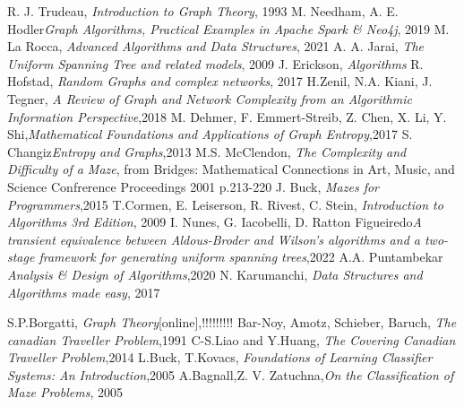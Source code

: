 
\begin{thebibliography}{100}

R. J. Trudeau, \emph{Introduction to Graph Theory}, 1993
M. Needham, A. E. Hodler\emph{Graph Algorithms, Practical Examples in Apache Spark & Neo4j}, 2019
M. La Rocca, \emph{Advanced Algorithms and Data Structures}, 2021 
A. A. Jarai, \emph{The Uniform Spanning Tree and related models}, 2009
 J. Erickson, \emph{Algorithms}
R. Hofstad, \emph{Random Graphs and complex networks}, 2017
H.Zenil, N.A. Kiani, J. Tegner, \emph{A Review of Graph and Network Complexity from an Algorithmic Information Perspective},2018
M. Dehmer, F. Emmert-Streib, Z. Chen, X. Li, Y. Shi,\emph{Mathematical Foundations and Applications of Graph Entropy},2017
S. Changiz\emph{Entropy and Graphs},2013
M.S. McClendon, \emph{The Complexity and Difficulty of a Maze}, from Bridges: Mathematical Connections in Art, Music, and Science Confrerence Proceedings 2001 p.213-220
J. Buck, \emph{Mazes for Programmers},2015
T.Cormen, E. Leiserson, R. Rivest, C. Stein, \emph{Introduction to Algorithms 3rd Edition}, 2009
I. Nunes, G. Iacobelli, D. Ratton Figueiredo\emph{A transient equivalence between Aldous-Broder and Wilson's algorithms and a two-stage framework for generating uniform spanning trees},2022
A.A. Puntambekar \emph{Analysis & Design of Algorithms},2020 
N. Karumanchi, \emph{Data Structures and Algorithms made easy}, 2017


S.P.Borgatti, \emph{Graph Theory}[online],!!!!!!!!!
Bar-Noy, Amotz, Schieber, Baruch, \emph{The canadian Traveller Problem},1991
C-S.Liao and Y.Huang, \emph{The Covering Canadian Traveller Problem},2014
L.Buck, T.Kovacs, \emph{Foundations of Learning Classifier Systems: An Introduction},2005
A.Bagnall,Z. V. Zatuchna,\emph{On the Classification of Maze Problems}, 2005




\end{thebibliography}
